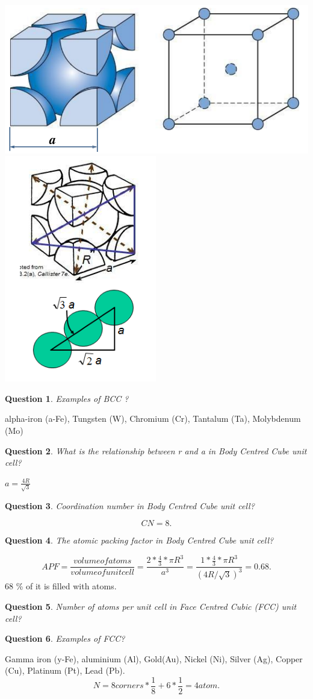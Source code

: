 \documentclass[13]{article}
\newtheorem{exer}{Question}
\begin{document}
\begin{center}
\includegraphics[scale=0.5]{figures/8.png} \includegraphics[scale=0.5]{figures/9.png}
\end{center}

\begin{exer}
Examples of BCC ?
\end{exer}
alpha-iron (a-Fe), Tungsten (W), Chromium (Cr), Tantalum (Ta), Molybdenum (Mo)
\begin{exer}
What is the relationship between r and a in Body Centred Cube unit cell?
\end{exer}
$a = \frac{4R}{\sqrt{3}}$
\begin{exer}
Coordination number in Body Centred Cube unit cell?
\end{exer}
\[
CN=8
.\] 
\begin{exer}
The atomic packing factor in Body Centred Cube unit cell?
\end{exer}
\[
	APF = \frac{volume of atoms}{volume of unit cell} = \frac{2* \frac{4}{3} * \pi R^3}{a^3}= \frac{1* \frac{4}{3} * \pi R^3}{(4R/\sqrt{3})^3}= 0.68
.\] 
68 \% of it is filled with atoms. 
\begin{exer} Number of atoms per unit cell in Face Centred Cubic (FCC) unit cell?
\end{exer}
\begin{exer}
Examples of FCC?
\end{exer}
Gamma iron (y-Fe), aluminium (Al), Gold(Au), Nickel (Ni), Silver (Ag), Copper (Cu), Platinum (Pt), Lead (Pb). 
\[
N = 8 corners * \frac{1}{8} + 6* \frac{1}{2}  = 4 atom 
.\]
\end{document}
